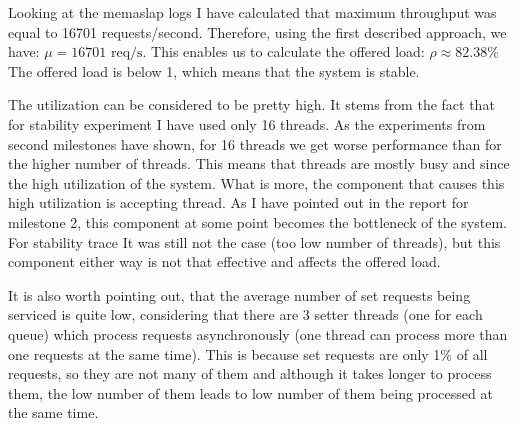 \documentclass[11pt]{article}
\begin{document}


Looking at the memaslap logs I have calculated that maximum throughput was equal to 16701 requests/second. Therefore, using the first described approach, we have:
$\mu = 16701\textrm{ req/s}$.
This enables us to calculate the offered load:
$\rho \approx 82.38\%$
The offered load is below 1, which means that the system is stable.

The utilization can be considered to be pretty high. It stems from the fact that for stability experiment I have used only 16 threads. As the experiments from second milestones have shown, for 16 threads we get worse performance than for the higher number of threads. This means that threads are mostly busy and since the high utilization of the system. What is more, the component that causes this high utilization is accepting thread. As I have pointed out in the report for milestone 2, this component at some point becomes the bottleneck of the system. For stability trace It was still not the case (too low number of threads), but this component either way is not that effective and affects the offered load.

It is also worth pointing out, that the average number of set requests being serviced is quite low, considering that there are 3 setter threads (one for each queue) which process requests asynchronously (one thread can process more than one requests at the same time). This is because set requests are only 1\% of all requests, so they are not many of them and although it takes longer to process them, the low number of them leads to low number of them being processed at the same time.
\end{document}
